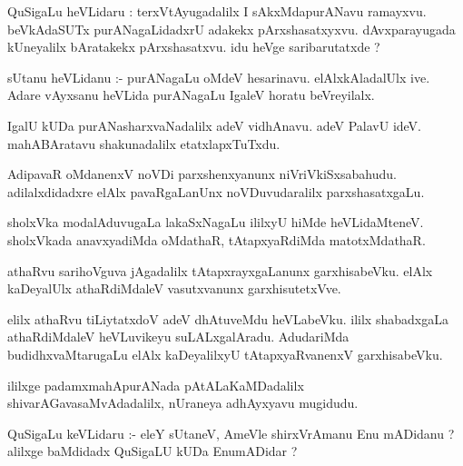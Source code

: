 \documentclass{article}
\begin{document}
\begin{mn}
QuSigaLu  heVLidaru : terxVtAyugadalilx I  sAkxMdapurANavu  ramayxvu.  beVkAdaSUTx  purANagaLidadxrU  adakekx  pArxshasatxyxvu.  
dAvxparayugada  kUneyalilx  bAratakekx  pArxshasatxvu.  idu  heVge  saribarutatxde ?
\end{mn}

\begin{mn}
sUtanu  heVLidanu :- purANagaLu  oMdeV  hesarinavu.  elAlxkAladalUlx  ive.  Adare  vAyxsanu  heVLida  purANagaLu  IgaleV  horatu  beVreyilalx.
\end{mn}

\begin{mn}
IgalU  kUDa  purANasharxvaNadalilx  adeV  vidhAnavu.  adeV  PalavU  ideV.  mahABAratavu  shakunadalilx  etatxlapxTuTxdu.
\end{mn}

\begin{mn}
AdipavaR  oMdanenxV  noVDi  parxshenxyanunx  niVriVkiSxsabahudu.  adilalxdidadxre  elAlx  pavaRgaLanUnx  noVDuvudaralilx  parxshasatxgaLu.
\end{mn}

\begin{mn}
sholxVka  modalAduvugaLa  lakaSxNagaLu  ililxyU  hiMde  heVLidaMteneV.  sholxVkada  anavxyadiMda  oMdathaR,  tAtapxyaRdiMda  matotxMdathaR.
\end{mn}

\begin{mn}
athaRvu  sarihoVguva  jAgadalilx  tAtapxrayxgaLanunx  garxhisabeVku.  elAlx  kaDeyalUlx  athaRdiMdaleV  vasutxvanunx  garxhisutetxVve.
\end{mn}

\begin{mn}
elilx  athaRvu  tiLiytatxdoV  adeV  dhAtuveMdu  heVLabeVku.  ililx  shabadxgaLa  athaRdiMdaleV  heVLuvikeyu  suLALxgalAradu.  AdudariMda  
budidhxvaMtarugaLu  elAlx  kaDeyalilxyU  tAtapxyaRvanenxV  garxhisabeVku.
\end{mn}

\begin{mn}
ililxge  padamxmahApurANada  pAtALaKaMDadalilx  shivarAGavasaMvAdadalilx,  nUraneya  adhAyxyavu  mugidudu.
\end{mn}

\begin{mn}
\end{mn}


\begin{mn}
QuSigaLu  keVLidaru :- eleY  sUtaneV,  AmeVle  shirxVrAmanu  Enu  mADidanu ?  alilxge  baMdidadx  QuSigaLU  kUDa  EnumADidar ?
\end{mn}
\end{document}
